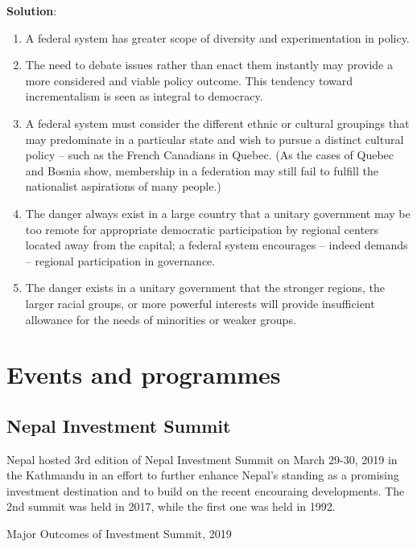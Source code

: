 \documentclass[
]{book}
\newenvironment{solution}{ {\bfseries Solution}:}{}
\begin{document}
\begin{questions}
\begin{solution}
\begin{enumerate}
\item A federal system has greater scope of diversity and experimentation in policy.
\item The need to debate issues rather than enact them instantly may provide a more considered and viable policy outcome. This tendency toward incrementalism is seen as integral to democracy.
\item A federal system must consider the different ethnic or cultural groupings that may predominate in a particular state and wish to pursue a distinct cultural policy -- such as the French Canadians in Quebec. (As the cases of Quebec and Bosnia show, membership in a federation may still fail to fulfill the nationalist aspirations of many people.)
\item The danger always exist in a large country that a unitary government may be too remote for appropriate democratic participation by regional centers located away from the capital; a federal system encourages -- indeed demands -- regional participation in governance.
\item The danger exists in a unitary government that the stronger regions, the larger racial groups, or more powerful interests will provide insufficient allowance for the needs of minorities or weaker groups.
\end{enumerate}
\end{solution}

\end{questions}

\hypertarget{events-and-programmes}{%
\section{Events and programmes}\label{events-and-programmes}}

\hypertarget{nepal-investment-summit}{%
\subsection{Nepal Investment Summit}\label{nepal-investment-summit}}

Nepal hosted 3rd edition of Nepal Investment Summit on March 29-30, 2019 in the Kathmandu in an effort to further enhance Nepal's standing as a promising investment destination and to build on the recent encouraing developments. The 2nd summit was held in 2017, while the first one was held in 1992.

Major Outcomes of Investment Summit, 2019
\end{document}

